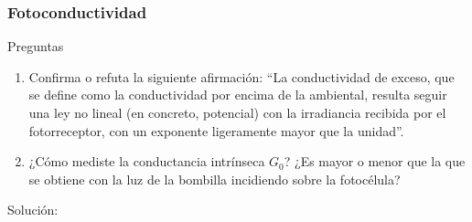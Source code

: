 \vspace*{2em}

\begin{Enunciado}
	\subsubsection{Fotoconductividad}
	Preguntas
	\begin{enumerate}[label=\alph*)]
		\item Confirma o refuta la siguiente afirmación: ``La conductividad de exceso, que se define como la conductividad por encima de la ambiental, resulta seguir una ley no lineal (en concreto, potencial) con la irradiancia recibida por el fotorreceptor, con un exponente ligeramente mayor que la unidad''.
		\item ¿Cómo mediste la conductancia intrínseca $G_0$? ¿Es mayor o menor que la que se obtiene con la luz de la bombilla incidiendo sobre la fotocélula?
	\end{enumerate}
\end{Enunciado}

Solución:

